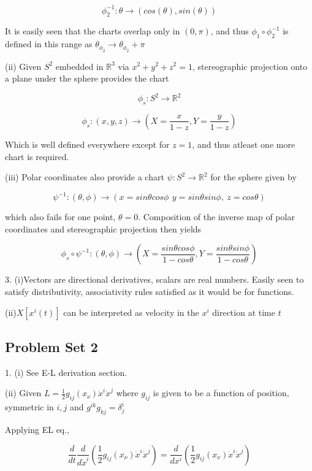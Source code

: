 \documentclass{article}\usepackage[]{graphicx}\usepackage[]{color}
\begin{document}
$$
\phi_2^{-1}: \theta \rightarrow (cos(\theta ),sin(\theta ))
$$

It is easily seen that the charts overlap only in $(0,\pi )$, and thus $\phi_1\circ\phi_2^{-1}$ is defined in this range as $\theta_{\phi_2}\rightarrow\theta_{\phi_2}+\pi$

(ii) Given $S^2$ embedded in $\mathbb{R}^3$ via $x^2+y^2+z^2=1$, stereographic projection onto a plane under the sphere provides the chart

 $$\phi_s:S^2\rightarrow \mathbb{R}^2$$

 $$\phi_s:(x,y,z)\rightarrow (X=\frac{x}{1-z},Y=\frac{y}{1-z})
 $$
 
Which is well defined everywhere except for $z=1$, and thus atleast one more chart is required.

(iii) Polar coordinates also provide a chart $\psi:S^2\rightarrow \mathbb{R}^2$ for the sphere given by 

$$
\psi^{-1}: (\theta ,\phi)\rightarrow(x=sin\theta cos\phi\,\ y=sin\theta sin\phi, \ z=cos\theta)
$$

which also fails for one point, $\theta=0$. Composition of the inverse map of polar coordinates and stereographic projection then yields

$$
\phi_s\circ\psi^{-1} :(\theta,\phi)\rightarrow (X=\frac{sin\theta cos\phi}{1-cos\theta},Y=\frac{sin\theta sin\phi}{1-cos\theta})
$$

3. (i)Vectors are directional derivatives, scalars are real numbers. Easily seen to satisfy distributivity, associativity rules satisfied as it would be for functions.

(ii)$X[x^i(t)]$ can be interpreted as velocity in the $x^i$ direction at time $t$

\pagebreak

\subsection{Problem Set 2}

1. (i) See E-L derivation section. %

(ii) Given $L=\frac{1}{2}g_{ij}(x_{\nu})\dot{x}^i\dot{x}^j$ where $g_{ij}$ is given to be a function of position, symmetric in $i,j$ and $g^{ik}g_{kj}=\delta^i_j$

Applying EL eq.,

$$
\frac{d}{dt}\frac{d}{d\dot{x}^i}\left(
\frac{1}{2}g_{ij}(x_{\nu})\dot{x}^i\dot{x}^j
\right)=\frac{d}{dx^i}\left(
\frac{1}{2}g_{ij}(x_{\nu})\dot{x}^i\dot{x}^j
\right)
$$
\end{document}
